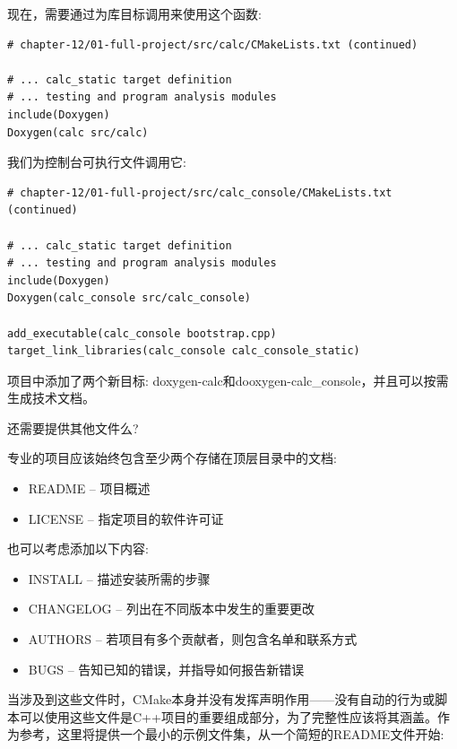 现在，需要通过为库目标调用来使用这个函数:

\begin{lstlisting}[style=styleCMake]
# chapter-12/01-full-project/src/calc/CMakeLists.txt (continued)

# ... calc_static target definition
# ... testing and program analysis modules
include(Doxygen)
Doxygen(calc src/calc)
\end{lstlisting}

我们为控制台可执行文件调用它:

\begin{lstlisting}[style=styleCMake]
# chapter-12/01-full-project/src/calc_console/CMakeLists.txt (continued)

# ... calc_static target definition
# ... testing and program analysis modules
include(Doxygen)
Doxygen(calc_console src/calc_console)

add_executable(calc_console bootstrap.cpp)
target_link_libraries(calc_console calc_console_static)
\end{lstlisting}

项目中添加了两个新目标: doxygen-calc和dooxygen-calc\_console，并且可以按需生成技术文档。

还需要提供其他文件么?


专业的项目应该始终包含至少两个存储在顶层目录中的文档:

\begin{itemize}
\item 
README – 项目概述

\item 
LICENSE – 指定项目的软件许可证
\end{itemize}

也可以考虑添加以下内容:

\begin{itemize}
\item 
INSTALL – 描述安装所需的步骤

\item 
CHANGELOG – 列出在不同版本中发生的重要更改

\item 
AUTHORS – 若项目有多个贡献者，则包含名单和联系方式

\item 
BUGS – 告知已知的错误，并指导如何报告新错误
\end{itemize}

当涉及到这些文件时，CMake本身并没有发挥声明作用——没有自动的行为或脚本可以使用这些文件是C++项目的重要组成部分，为了完整性应该将其涵盖。作为参考，这里将提供一个最小的示例文件集，从一个简短的README文件开始:

